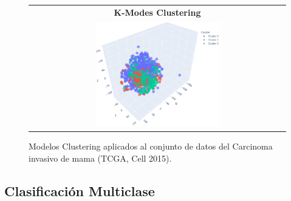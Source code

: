 \begin{figure}
	\setlength\tabcolsep{3pt}%
	\centering
	\begin{tabular}{c}
		\textbf{K-Modes Clustering} \\
		\includegraphics[width=0.5\textwidth]{NOTEBOOK/IMAGENES_CLUSTERING/TNSE_Kmodes}
	\end{tabular}
	\caption{Modelos Clustering aplicados al conjunto de datos del Carcinoma invasivo de mama (TCGA, Cell 2015). }
	\label{Clustering_Models_graphics}
\end{figure}


 

\subsection{Clasificación Multiclase}

